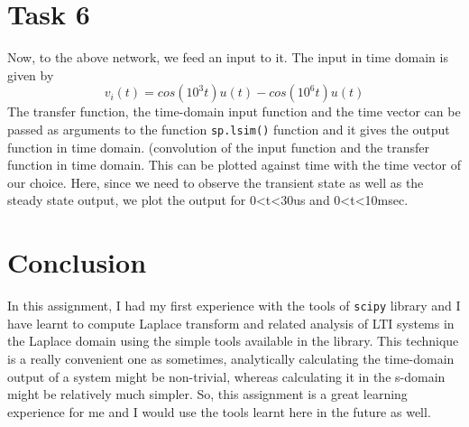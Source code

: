 \documentclass[11pt, a4paper]{article}
\begin{document}
\section{Task 6}
Now, to the above network, we feed an input to it. The input in time domain is given by
\begin{equation*}
v_i (t) = cos(10^3t)u(t) - cos(10^6t)u(t)
\end{equation*}
The transfer function, the time-domain input function and the time vector can be passed as arguments to the function \texttt{sp.lsim()} function and it gives the output function in time domain. (convolution of the input function and the transfer function in time domain. This can be plotted against time with the time vector of our choice. Here, since we need to observe the transient state as well as the steady state output, we plot the output for 0<t<30us and 0<t<10msec.

\section{Conclusion}
In this assignment, I had my first experience with the tools of \texttt{scipy} library and I have learnt to compute Laplace transform and related analysis of LTI systems in the Laplace domain using the simple tools available in the library. This technique is a really convenient one as sometimes, analytically calculating the time-domain output of a system might be non-trivial, whereas calculating it in the s-domain might be relatively much simpler. So, this assignment is a great learning experience for me and I would use the tools learnt here in the future as well.
\end{document}
